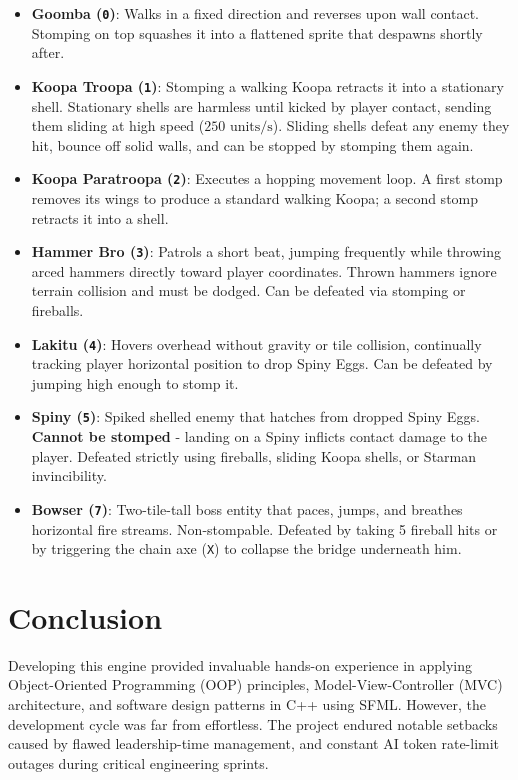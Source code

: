 \documentclass[12pt, a4paper]{article}
\begin{document}
\begin{itemize}
\item \textbf{Goomba (\texttt{0})}: Walks in a fixed direction and reverses upon wall contact. Stomping on top squashes it into a flattened sprite that despawns shortly after.
\item \textbf{Koopa Troopa (\texttt{1})}: Stomping a walking Koopa retracts it into a stationary shell. Stationary shells are harmless until kicked by player contact, sending them sliding at high speed ($250\text{ units/s}$). Sliding shells defeat any enemy they hit, bounce off solid walls, and can be stopped by stomping them again.
\item \textbf{Koopa Paratroopa (\texttt{2})}: Executes a hopping movement loop. A first stomp removes its wings to produce a standard walking Koopa; a second stomp retracts it into a shell.
\item \textbf{Hammer Bro (\texttt{3})}: Patrols a short beat, jumping frequently while throwing arced hammers directly toward player coordinates. Thrown hammers ignore terrain collision and must be dodged. Can be defeated via stomping or fireballs.
\item \textbf{Lakitu (\texttt{4})}: Hovers overhead without gravity or tile collision, continually tracking player horizontal position to drop Spiny Eggs. Can be defeated by jumping high enough to stomp it.
\item \textbf{Spiny (\texttt{5})}: Spiked shelled enemy that hatches from dropped Spiny Eggs. \textbf{Cannot be stomped} - landing on a Spiny inflicts contact damage to the player. Defeated strictly using fireballs, sliding Koopa shells, or Starman invincibility.
\item \textbf{Bowser (\texttt{7})}: Two-tile-tall boss entity that paces, jumps, and breathes horizontal fire streams. Non-stompable. Defeated by taking 5 fireball hits or by triggering the chain axe (\texttt{X}) to collapse the bridge underneath him.
\end{itemize}

\newpage

\section{Conclusion}

Developing this engine provided invaluable hands-on experience in applying Object-Oriented Programming (OOP) principles, Model-View-Controller (MVC) architecture, and software design patterns in C++ using SFML. However, the development cycle was far from effortless. The project endured notable setbacks caused by flawed leadership-time management, and constant AI token rate-limit outages during critical engineering sprints. 
\end{document}
